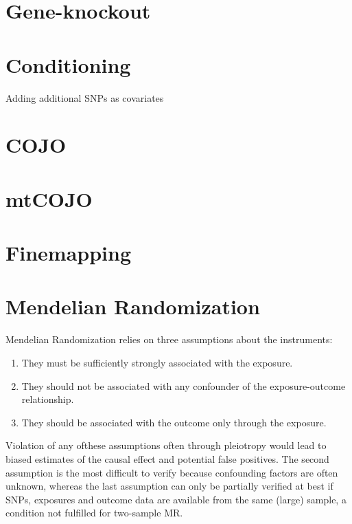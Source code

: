 \documentclass[
]{book}
\providecommand{\tightlist}{%
  \setlength{\itemsep}{0pt}\setlength{\parskip}{0pt}}
\begin{document}
\hypertarget{gene-knockout}{%
\section{Gene-knockout}\label{gene-knockout}}

\hypertarget{conditioning}{%
\section{Conditioning}\label{conditioning}}

Adding additional SNPs as covariates

\hypertarget{cojo}{%
\section{COJO}\label{cojo}}

\hypertarget{mtcojo}{%
\section{mtCOJO}\label{mtcojo}}

\hypertarget{finemapping}{%
\section{Finemapping}\label{finemapping}}

\hypertarget{mendelian-randomization}{%
\section{Mendelian Randomization}\label{mendelian-randomization}}

Mendelian Randomization relies on three assumptions about the instruments:

\begin{enumerate}
\def\labelenumi{\arabic{enumi})}
\tightlist
\item
  They must be sufficiently strongly associated with the exposure.
\item
  They should not be associated with any confounder of the exposure-outcome relationship.
\item
  They should be associated with the outcome only through the exposure.
\end{enumerate}

Violation of any ofthese assumptions often through pleiotropy would lead to biased estimates of the causal effect and potential false positives. The second assumption is the most difficult to verify because confounding factors are often unknown, whereas the last assumption can only be partially verified at best if SNPs, exposures and outcome data are available from the same (large) sample, a condition not fulfilled for two-sample MR.
\end{document}
